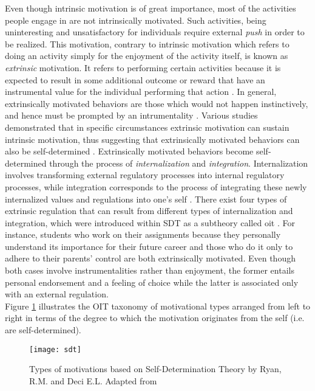 Even though intrinsic motivation is of great importance, most of the activities people engage in are not intrinsically motivated. Such activities, being uninteresting and unsatisfactory for individuals  require external \textit{push} in order to be realized. This motivation, contrary to intrinsic motivation which refers to doing an activity simply for the enjoyment of the activity itself, is known as \textit{extrinsic} motivation. It refers to performing certain activities because it is expected to result in some additional outcome or reward that have an instrumental value for the individual performing that action \cite{ryan2000self}. In general, extrinsically motivated behaviors are those which would not happen instinctively, and hence must be prompted by an intrumentality \cite{deci1994promoting}. Various studies demonstrated that in specific circumstances extrinsic motivation can sustain intrinsic motivation, thus suggesting that extrinsically motivated behaviors can also be self-determined \cite{deci1994promoting}. Extrinsically motivated behaviors become self-determined through the process of \textit{internalization} and \textit{integration}. Internalization involves transforming external regulatory processes into internal regulatory processes, while integration corresponds to the process of integrating these newly internalized values and regulations into one's self \cite{deci1994promoting}. There exist four types of extrinsic regulation that can result from different types of internalization and integration, which were introduced within SDT as a subtheory called \acrfull{oit} \cite{deci1994promoting, ryan2000intrinsic, ryan2000self}. For instance, students who work on their assignments because they personally understand its importance for their future career and those who do it only to adhere to their parents' control are both extrinsically motivated. Even though both cases involve instrumentalities rather than enjoyment, the former entails personal endorsement and a feeling of choice while the latter is associated only with an external regulation.\\
Figure \ref{fig:tax} illustrates the OIT taxonomy of motivational types arranged from left to right in terms of the degree to which the motivation originates from the self (i.e. are self-determined).\\ 
\begin{figure}[h]
    \centering
    \texttt{[image: sdt]}
    \caption{Types of motivations based on Self-Determination  Theory by Ryan, R.M. and Deci E.L. Adapted from  \cite{ryan2000intrinsic}}
    \label{fig:tax}
\end{figure}\\
